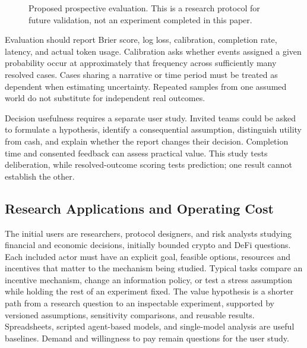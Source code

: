 \begin{figure}[t]
\centering
{}
\caption{Proposed prospective evaluation. This is a research protocol for
future validation, not an experiment completed in this paper.}
\label{fig:evaluation}
\end{figure}

Evaluation should report Brier score, log loss, calibration, completion rate,
latency, and actual token usage. Calibration asks whether events assigned a
given probability occur at approximately that frequency across sufficiently
many resolved cases. Cases sharing a narrative or time period must be treated
as dependent when estimating uncertainty. Repeated samples from one assumed
world do not substitute for independent real outcomes.

Decision usefulness requires a separate user study. Invited teams could be
asked to formulate a hypothesis, identify a consequential assumption,
distinguish utility from cash,
and explain whether the report changes their decision. Completion time and
consented feedback can assess practical value. This study tests deliberation,
while resolved-outcome scoring tests prediction; one result cannot establish
the other.

\subsection{Research Applications and Operating Cost}\label{sec:business}
The initial users are researchers, protocol designers, and risk analysts
studying financial and economic decisions, initially bounded crypto and DeFi
questions. Each included actor must have an explicit goal, feasible options,
resources and incentives that matter to the mechanism being studied. Typical tasks compare an
incentive mechanism, change an information policy, or test a stress assumption
while holding the rest of an experiment fixed. The value hypothesis is a
shorter path from a research question to an inspectable experiment, supported
by versioned assumptions, sensitivity comparisons, and reusable results.
Spreadsheets, scripted agent-based models, and single-model analysis are useful
baselines. Demand and willingness to pay remain questions for the user study.


